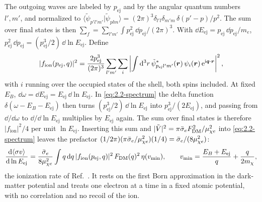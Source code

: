 The outgoing waves are labeled by $p_{\mathrm{ej}}$ and by the angular quantum numbers $l', m'$, and normalized to $\langle\tilde\psi_{p'l'm'}|\tilde\psi_{plm}\rangle = (2\pi)^3\delta_{l'l}\delta_{m'm}\,\delta(p' - p)/p^2$. The sum over final states is then $\sum_f = \sum_{l'm'}\int p_{\mathrm{ej}}^2\,\dd p_{\mathrm{ej}}/(2\pi)^3$. With $\dd E_{\mathrm{ej}} = p_{\mathrm{ej}}\,\dd p_{\mathrm{ej}}/m_e$, $p_{\mathrm{ej}}^2\,\dd p_{\mathrm{ej}} = (p_{\mathrm{ej}}^3/2)\,\dd\ln E_{\mathrm{ej}}$. Define
\begin{equation}
  |f_{\mathrm{ion}}(p_{\mathrm{ej}}, q)|^2 = \frac{2p_{\mathrm{ej}}^3}{(2\pi)^3}\sum_{l'm'}\sum_i\left|\int\mathrm{d}^3r\,\tilde\psi^*_{p_{\mathrm{ej}}l'm'}(\bm{r})\,\psi_i(\bm{r})\,\mathrm{e}^{\mathrm{i}\bm{q}\cdot\bm{r}}\right|^2 ,
  \label{eq:2.2-fion}
\end{equation}
with $i$ running over the occupied states of the shell, both spins included. At fixed $E_B$, $\dd\omega = \dd E_{\mathrm{ej}} = E_{\mathrm{ej}}\,\dd\ln E_{\mathrm{ej}}$. In \cref{eq:2.2-spectrum} the delta function $\delta(\omega - E_B - E_{\mathrm{ej}})$ then turns $(p_{\mathrm{ej}}^3/2)\,\dd\ln E_{\mathrm{ej}}$ into $p_{\mathrm{ej}}^3/(2E_{\mathrm{ej}})$, and passing from $\dd/\dd\omega$ to $\dd/\dd\ln E_{\mathrm{ej}}$ multiplies by $E_{\mathrm{ej}}$ again. The sum over final states is therefore $|f_{\mathrm{ion}}|^2/4$ per unit $\ln E_{\mathrm{ej}}$. Inserting this sum and $|\tilde V|^2 = \pi\bar{\sigma}_{e}F_{\mathrm{DM}}^2/\mu_{\chi e}^2$ into \cref{eq:2.2-spectrum} leaves the prefactor $(1/2\pi)(\pi\bar{\sigma}_{e}/\mu_{\chi e}^2)(1/4) = \bar{\sigma}_{e}/(8\mu_{\chi e}^2)$:
\begin{equation}
  \frac{\mathrm{d}\langle\sigma v\rangle}{\mathrm{d}\ln E_{\mathrm{ej}}} = \frac{\bar{\sigma}_{e}}{8\mu_{\chi e}^2}\int q\,\mathrm{d} q\,|f_{\mathrm{ion}}(p_{\mathrm{ej}}, q)|^2\,F_{\mathrm{DM}}(q)^2\,\eta(v_{\mathrm{min}}) , \qquad v_{\mathrm{min}} = \frac{E_B + E_{\mathrm{ej}}}{q} + \frac{q}{2m_\chi} ,
  \label{eq:2.2-ion}
\end{equation}
the ionization rate of Ref.~\cite[Eqs.~(5) and (6)]{essig2012direct}. It rests on the first Born approximation in the dark-matter potential and treats one electron at a time in a fixed atomic potential, with no correlation and no recoil of the ion.

